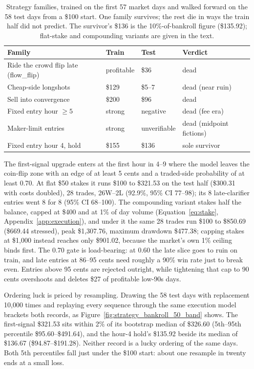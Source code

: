 \begin{table}[h]
    \centering
    \small
    \caption{Strategy families, trained on the first 57 market days and
    walked forward on the 58 test days from a \$100 start. One family
    survives; the rest die in ways the train half did not predict. The
    survivor's \$136 is the 10\%-of-bankroll figure (\$135.92); flat-stake
    and compounding variants are given in the text.}
    \label{tab:strategy_graveyard}
    \begin{tabular}{llll}
        \toprule
        Family & Train & Test & Verdict \\
        \midrule
        Ride the crowd flip late (flow\_flip) & profitable & \$36 & dead \\
        Cheap-side longshots & \$129 & \$5--7 & dead (near ruin) \\
        Sell into convergence & \$200 & \$96 & dead \\
        Fixed entry hour $\geq 5$ & strong & negative & dead (fee era) \\
        Maker-limit entries & strong & unverifiable & dead (midpoint fictions) \\
        Fixed entry hour 4, hold & \$155 & \$136 & sole survivor \\
        \bottomrule
    \end{tabular}
\end{table}

The first-signal upgrade enters at the first hour in 4--9 where the model
leaves the coin-flip zone with an edge of at least 5 cents and a traded-side
probability of at least 0.70. At flat \$50 stakes it runs \$100 to \$321.53
on the test half (\$300.31 with costs doubled), 28 trades, 26W--2L (92.9\%,
95\% CI 77--98); its 8 late-clarifier entries went 8 for 8 (95\% CI
68--100). The compounding variant stakes half the balance, capped at
\$400 and at 1\% of day volume (Equation~\ref{eq:stake},
Appendix~\ref{app:execution}),
and under it the same 28 trades run \$100 to \$850.69 (\$669.44
stressed), peak \$1{,}307.76, maximum drawdown \$477.38; capping stakes at
\$1{,}000 instead reaches only \$901.02, because the market's own 1\%
ceiling binds first. The 0.70 gate is load-bearing: at 0.60 the late slice
goes to ruin on train, and late entries at 86--95 cents need roughly a 90\%
win rate just to break even. Entries above 95 cents are rejected outright,
while tightening that cap to 90 cents overshoots and deletes \$27 of
profitable low-90s days.

Ordering luck is priced by resampling. Drawing the 58 test days with
replacement 10{,}000 times and replaying every sequence through the same
execution model brackets both records, as
Figure~\ref{fig:strategy_bankroll_50_band} shows. The first-signal
\$321.53 sits within 2\% of its bootstrap median of \$326.60 (5th--95th
percentile \$95.60--\$491.64), and the hour-4 hold's \$135.92 beside its
median of \$136.67 (\$94.87--\$191.28). Neither record is a lucky ordering
of the same days. Both 5th percentiles fall just under the \$100 start:
about one resample in twenty ends at a small loss.

